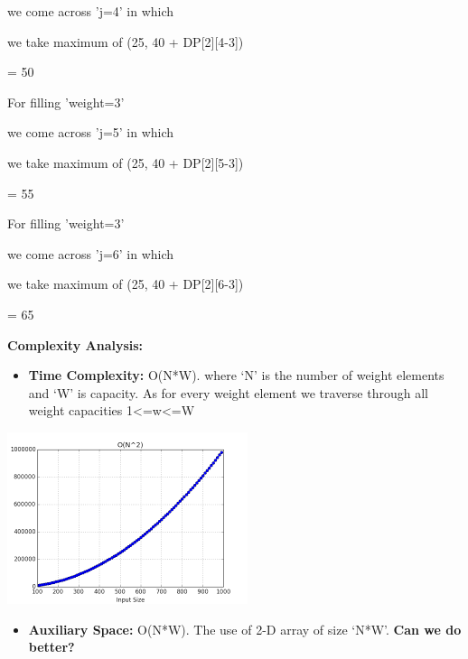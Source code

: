 \documentclass[letterpaper]{article}
\newcommand\liststyleWWNumii{%
\renewcommand\labelitemi{\ding{108}}
\renewcommand\labelitemii{{\BigCircle}}
\renewcommand\labelitemiii{\ding{110}}
\renewcommand\labelitemiv{\ding{108}}
}
\begin{document}
\begin{multicols}{2}
we come across 'j=4' in which 

we take maximum of (25, 40 + DP[2][4-3]) 

= 50


\bigskip

For filling 'weight=3' 

we come across 'j=5' in which 

we take maximum of (25, 40 + DP[2][5-3])

= 55


\bigskip

For filling 'weight=3' 

we come across 'j=6' in which 

we take maximum of (25, 40 + DP[2][6-3])

= 65

\textbf{\textcolor[rgb]{0.2509804,0.25882354,0.30588236}{Complexity
Analysis:}}\textcolor[rgb]{0.2509804,0.25882354,0.30588236}{ }

\liststyleWWNumii
\begin{itemize}
\item \textbf{\textcolor[rgb]{0.2509804,0.25882354,0.30588236}{Time
Complexity:}}\textcolor[rgb]{0.2509804,0.25882354,0.30588236}{ O(N*W). \newline
where `N' is the number of weight elements and `W' is capacity. As for every weight element we traverse through all
weight capacities 1{\textless}=w{\textless}=W}
\end{itemize}

\bigskip
\includegraphics[scale=1.0]{complexity}

\bigskip

\liststyleWWNumii
\begin{itemize}
\item \textbf{\textcolor[rgb]{0.2509804,0.25882354,0.30588236}{Auxiliary
Space:}}\textcolor[rgb]{0.2509804,0.25882354,0.30588236}{ O(N*W). \newline
The use of 2-D array of size `N*W'.}
{\bfseries
Can we do better? }


\end{itemize}
\end{multicols}
\end{document}
